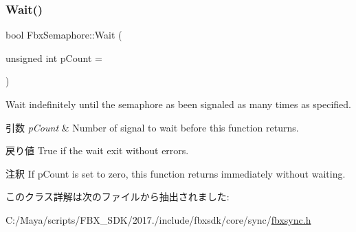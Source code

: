 \subsubsection{\texorpdfstring{Wait()}{Wait()}}
{\footnotesize\ttfamily bool Fbx\+Semaphore\+::\+Wait (\begin{DoxyParamCaption}\item[{unsigned int}]{p\+Count = {} }\end{DoxyParamCaption})}

Wait indefinitely until the semaphore as been signaled as many times as specified. 
\begin{DoxyParams}{引数}
{\em p\+Count} & Number of signal to wait before this function returns. \\
\hline
\end{DoxyParams}
\begin{DoxyReturn}{戻り値}
True if the wait exit without errors. 
\end{DoxyReturn}
\begin{DoxyRemark}{注釈}
If p\+Count is set to zero, this function returns immediately without waiting. 
\end{DoxyRemark}


このクラス詳解は次のファイルから抽出されました\+:\begin{DoxyCompactItemize}
\item 
C\+:/\+Maya/scripts/\+F\+B\+X\+\_\+\+S\+D\+K/2017./include/fbxsdk/core/sync/\hyperlink{fbxsync_8h}{fbxsync.\+h}\end{DoxyCompactItemize}
